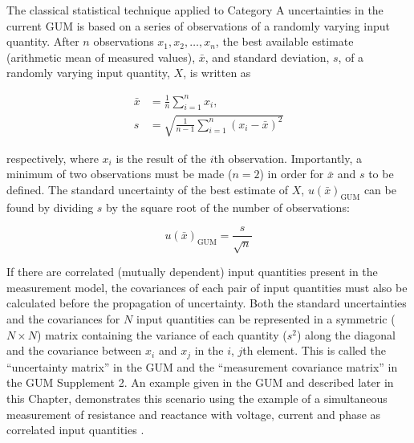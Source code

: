 \documentclass[../thesis/thesis.tex]{subfiles}
\begin{document}
\begin{refsection}
The classical statistical technique \cite{Neyman_1937} applied to Category A uncertainties in the current GUM is based on a series of observations of a randomly varying input quantity. After $n$ observations $x_1,x_2,\dots,x_n$, the best available estimate (arithmetic mean of measured values), $\bar{x}$, and standard deviation, $s$, of a randomly varying input quantity, $X$, is written as

\begin{align}
\bar{x} & =\frac{1}{n}\sum_{i=1}^{n}x_i,\\
s & =\sqrt{\frac{1}{n-1}\sum_{i=1}^{n}(x_i-\bar{x})^2}
\end{align}

respectively, where $x_i$ is the result of the $i$th observation. Importantly, a minimum of two observations must be made ($n=2$) in order for $\bar{x}$ and $s$ to be defined. The standard uncertainty of the best estimate of $X$, $u(\bar{x})_{\textrm{GUM}}$ can be found by dividing $s$ by the square root of the number of observations:

\begin{equation}
u(\bar{x})_{\textrm{GUM}}=\frac{s}{\sqrt{n}}
\label{ch3_eqn_ux_gum}
\end{equation}

If there are correlated (mutually dependent) input quantities present in the measurement model, the covariances of each pair of input quantities must also be calculated before the propagation of uncertainty. Both the standard uncertainties and the covariances for $N$ input quantities can be represented in a symmetric ($N\times N$) matrix containing the variance of each quantity ($s^2$) along the diagonal and the covariance between $x_i$ and $x_j$ in the $i$, $j$th element. This is called the “uncertainty matrix” in the GUM and the “measurement covariance matrix” in the GUM Supplement 2. An example given in the GUM and described later in this Chapter, demonstrates this scenario using the example of a simultaneous measurement of resistance and reactance with voltage, current and phase as correlated input quantities \cite[Example~H.2]{GUM_2008}. 


\end{refsection}
\end{document}
